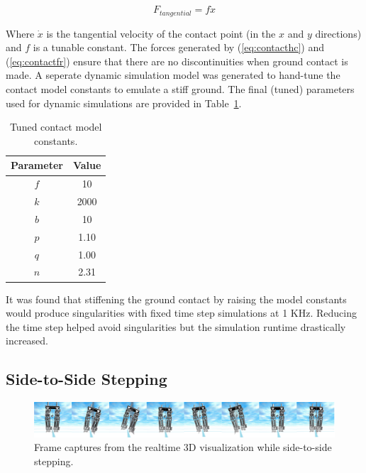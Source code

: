 \begin{equation}
	\label{eq:contactfr}
	{F_{tangential}} = f{\dot x}
\end{equation}

Where $\dot x$ is the tangential velocity of the contact point (in the $x$ and $y$ directions) and $f$ is a tunable constant. The forces generated by (\ref{eq:contacthc}) and (\ref{eq:contactfr}) ensure that there are no discontinuities when ground contact is made. A seperate dynamic simulation model was generated to hand-tune the contact model constants to emulate a stiff ground. The final (tuned) parameters used for dynamic simulations are provided in Table~\ref{tab:contactk}.

\begin{table}[!h]
  \centering
  \caption{Tuned contact model constants.}
    \begin{tabular}{cc}
    \addlinespace
    \toprule
    \textbf{Parameter} & \textbf{Value}\\
    \midrule
	$f$	&	10 \\
    $k$	&	2000 \\
    $b$	&	10 \\
    $p$	&	1.10 \\
    $q$  &	1.00 \\
    $n$	&	2.31 \\
    \bottomrule
    \end{tabular}
  \label{tab:contactk}
\end{table}

It was found that stiffening the ground contact by raising the model constants would produce singularities with fixed time step simulations at 1 KHz. Reducing the time step helped avoid singularities but the simulation runtime drastically increased. 

\subsection{Side-to-Side Stepping} %
\label{sub:3d_simulations}

\begin{figure}[!b]
	\centering
    \includegraphics[scale=0.095]{fig/simulations/sidesequence.png}
  	\caption{Frame captures from the realtime 3D visualization while side-to-side stepping.}
	\label{fig:sidesequence}
\end{figure}

